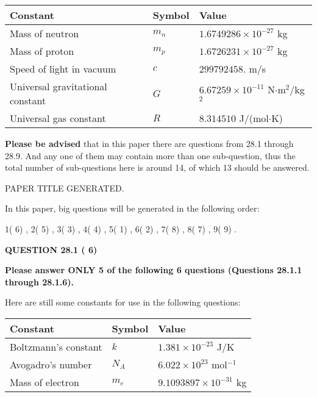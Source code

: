 \documentclass[12pt]{article}
\begin{document}
 
\noindent\begin{tabular}{|l|l|l|}
\hline
Constant & Symbol & Value \\
\hline
Mass of neutron &
$m_n$ &
 $ 1.6749286 \times 10^{-27} $
kg \\
\hline
Mass of proton &
$m_p$ &
 $ 1.6726231 \times 10^{-27} $
kg \\
\hline
Speed of light in vacuum &
$c$ &
 $ 299792458. $
m/s \\
\hline
Universal gravitational constant &
$G$ &
 $ 6.67259 \times 10^{-11} $
N$\cdot $m$^2$/kg$^2$ \\
\hline
Universal gas constant &
$R$ &
 $ 8.314510 $
J/(mol$\cdot $K) \\
\hline
\end{tabular}
 
 
{\textbf{\large{Please be advised}}} that in this paper there are questions from
28.1 through
28.9.
And any one of them may contain more than one sub-question, thus the total number
of sub-questions here is around 14, of which
13 should be answered.
 
\vspace{0.3in}
 
 
   
   
 PAPER TITLE GENERATED.
   
   
   
\vspace{0.2in}
   
In this paper, big questions will be generated in the following order: 
   
   
            1(          6)
 ,
            2(          5)
 ,
            3(          3)
 ,
            4(          4)
 ,
            5(          1)
 ,
            6(          2)
 ,
            7(          8)
 ,
            8(          7)
 ,
            9(          9)
 .
  
\vspace{0.2in}
  
{\textbf{\Large{QUESTION
28.1 
 (          6)
}}}
  
  
 
{\textbf{\Large{Please answer ONLY
5 of the following
6 questions (Questions
28.1.1 through
28.1.6). }}}
 
Here are still some constants for use in the following questions:
 
 
\noindent\begin{tabular}{|l|l|l|}
\hline
Constant & Symbol & Value \\
\hline
 
Boltzmann's constant &
$k$ &
 $ 1.381 \times 10^{-23} $
J/K \\
\hline
 
Avogadro's number &
$N_A$ &
 $ 6.022 \times 10^{23} $
mol$^{-1}$ \\
\hline
 
Mass of electron &
$m_e$ &
 $ 9.1093897 \times 10^{-31} $
kg \\
\hline
 
\end{tabular}
 
\end{document}

